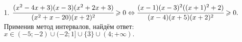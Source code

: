 1. $\cfrac{(x^2-4x+3)(x-3)(x^2+2x+3)}{(x^2+x-20)(x+2)^2}\geqslant0 \Leftrightarrow \cfrac{(x-1)(x-3)^2((x+1)^2+2)}{(x-4)(x+5)(x+2)^2}\geqslant0.$ Применив метод интервалов, найдём ответ: $x\in(-5;-2)\cup(-2;1]\cup\{3\}\cup(4;+\infty).$
\begin{figure}[ht!]
\end{figure}\\
